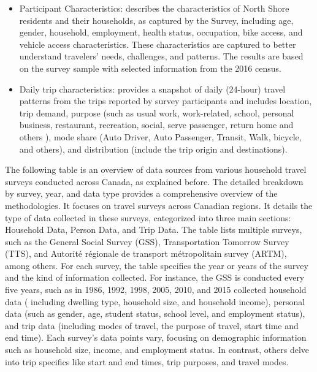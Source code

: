 \documentclass[
11pt, %
oneside, %
english, %
singlespacing, %
]{macthesis} %
\begin{document}
\begin{itemize}
\item
  Participant Characteristics: describes the characteristics of North Shore residents and their households, as captured by the Survey, including age, gender, household, employment, health status, occupation, bike access, and vehicle access characteristics. These characteristics are captured to better understand travelers' needs, challenges, and patterns. The results are based on the survey sample with selected information from the 2016 census.
\item
  Daily trip characteristics: provides a snapshot of daily (24-hour) travel patterns from the trips reported by survey participants and includes location, trip demand, purpose (such as usual work, work-related, school, personal business, restaurant, recreation, social, serve passenger, return home and others ), mode share (Auto Driver, Auto Passenger, Transit, Walk, bicycle, and others), and distribution (include the trip origin and destinations).
\end{itemize}

The following table is an overview of data sources from various household travel surveys conducted across Canada, as explained before. The detailed breakdown by survey, year, and data type provides a comprehensive overview of the methodologies. It focuses on travel surveys across Canadian regions. It details the type of data collected in these surveys, categorized into three main sections: Household Data, Person Data, and Trip Data. The table lists multiple surveys, such as the General Social Survey (GSS), Transportation Tomorrow Survey (TTS), and Autorité régionale de transport métropolitain survey (ARTM), among others. For each survey, the table specifies the year or years of the survey and the kind of information collected. For instance, the GSS is conducted every five years, such as in 1986, 1992, 1998, 2005, 2010, and 2015 collected household data ( including dwelling type, household size, and household income), personal data (such as gender, age, student status, school level, and employment status), and trip data (including modes of travel, the purpose of travel, start time and end time). Each survey's data points vary, focusing on demographic information such as household size, income, and employment status. In contrast, others delve into trip specifics like start and end times, trip purposes, and travel modes.
\end{document}
